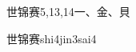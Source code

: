 \begin{entry}{世锦赛}{5,13,14}{⼀、⾦、⾙}
  \begin{phonetics}{世锦赛}{shi4jin3sai4}
  \end{phonetics}
\end{entry}
